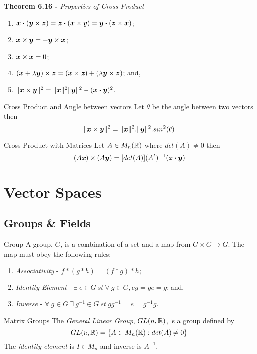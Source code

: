 \documentclass[11pt,a4paper]{article}
\begin{document}
\textbf{Theorem 6.16 - }\textit{Properties of Cross Product}
\begin{enumerate}[label=\roman*)]
  \item $ \boldsymbol{x} \boldsymbol{\cdot} (\boldsymbol{y} \times \boldsymbol{z}) = \boldsymbol{z} \boldsymbol{\cdot} (\boldsymbol{x} \times \boldsymbol{y}) = \boldsymbol{y} \boldsymbol{\cdot} (\boldsymbol{z} \times \boldsymbol{x}) $;
  \item $ \boldsymbol{x} \times \boldsymbol{y} = - \boldsymbol{y} \times \boldsymbol{x} $;
  \item $ \boldsymbol{x} \times \boldsymbol{x} = 0 $;
  \item $ (\boldsymbol{x} + \lambda\boldsymbol{y}) \times \boldsymbol{z} = (\boldsymbol{x} \times \boldsymbol{z}) + (\lambda\boldsymbol{y} \times \boldsymbol{z}) $; and,
  \item $ \|\boldsymbol{x} \times \boldsymbol{y}\|^2 = \|\boldsymbol{x}\|^2\|\boldsymbol{y}\|^2 - (\boldsymbol{x} \boldsymbol{\cdot} \boldsymbol{y})^2$.
\end{enumerate}

\subtitle{Theorem 6.17 - }{Cross Product and Angle between vectors}
Let $\theta$ be the angle between two vectors then
$$\|\boldsymbol{x} \times  \boldsymbol{y}\|^2 = \|\boldsymbol{x}\|^2.\|\boldsymbol{y}\|^2.sin^2(\theta)$$

\subtitle{Theorem 6.18 - }{Cross Product with Matrices}
Let $A \in M_n(\mathbb{R})$ where $det(A) \not = 0$ then
$$(A\boldsymbol{x}) \times (A\boldsymbol{y}) = [det(A)](A^t)^{-1}(\boldsymbol{x} \boldsymbol{\cdot} \boldsymbol{y})$$

\section{Vector Spaces}

\subsection{Groups \& Fields}

\subtitle{Definition 7.01 - }{Group}
A group, $G$, is a combination of a set and a map from $G \times G \to G$. The map must obey the following rules:
\begin{enumerate}[label=\roman*)]
  \item \textit{Associativity} - $f * (g * h) = (f * g) * h$;
  \item \textit{Identity Element} - $\exists\ e \in G\ st\ \forall\ g \in G, eg = ge = g$; and,
  \item \textit{Inverse} - $\forall\ g \in G\ \exists\ g^{-1} \in G\ st\ gg^{-1} = e = g^{-1}g$.
\end{enumerate}

\subtitle{Definition 7.02 - }{Matrix Groups}
The \textit{General Linear Group}, $GL(n, \mathbb{R})$, is a group defined by $$GL(n ,\mathbb{R}) = \{A \in M_n(\mathbb{R}) : det(A) \not = 0\}$$
The \textit{identity element} is $I \in M_n$ and inverse is $A^{-1}$. \\
\end{document}
